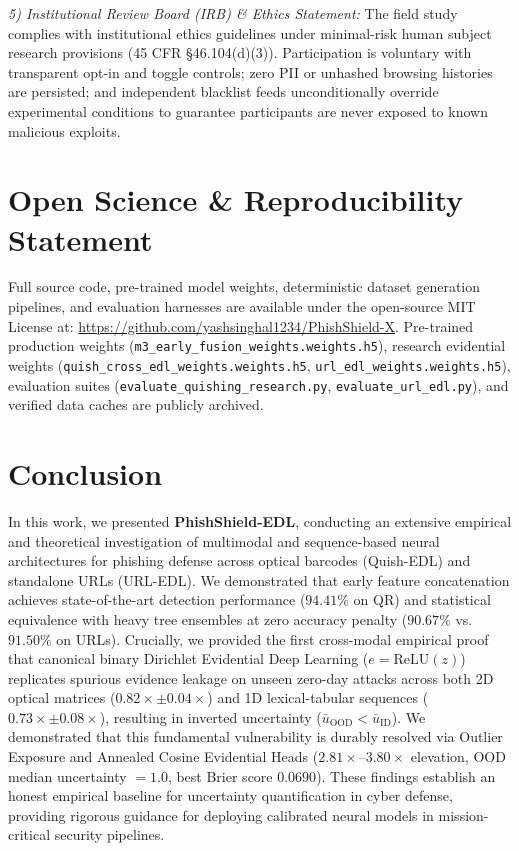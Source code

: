 \documentclass[conference]{IEEEtran}
\begin{document}
\textit{5) Institutional Review Board (IRB) \& Ethics Statement:} The field study complies with institutional ethics guidelines under minimal-risk human subject research provisions (45 CFR \S46.104(d)(3)). Participation is voluntary with transparent opt-in and toggle controls; zero PII or unhashed browsing histories are persisted; and independent blacklist feeds unconditionally override experimental conditions to guarantee participants are never exposed to known malicious exploits.

\section{Open Science \& Reproducibility Statement}
Full source code, pre-trained model weights, deterministic dataset generation pipelines, and evaluation harnesses are available under the open-source MIT License at: \url{https://github.com/yashsinghal1234/PhishShield-X}. Pre-trained production weights (\texttt{m3\_early\_fusion\_weights.weights.h5}), research evidential weights (\texttt{quish\_cross\_edl\_weights.weights.h5}, \texttt{url\_edl\_weights.weights.h5}), evaluation suites (\texttt{evaluate\_quishing\_research.py}, \texttt{evaluate\_url\_edl.py}), and verified data caches are publicly archived.

\section{Conclusion}
In this work, we presented \textbf{PhishShield-EDL}, conducting an extensive empirical and theoretical investigation of multimodal and sequence-based neural architectures for phishing defense across optical barcodes (Quish-EDL) and standalone URLs (URL-EDL). We demonstrated that early feature concatenation achieves state-of-the-art detection performance ($94.41\%$ on QR) and statistical equivalence with heavy tree ensembles at zero accuracy penalty ($90.67\%$ vs. $91.50\%$ on URLs). Crucially, we provided the first cross-modal empirical proof that canonical binary Dirichlet Evidential Deep Learning ($e = \text{ReLU}(z)$) replicates spurious evidence leakage on unseen zero-day attacks across both 2D optical matrices ($0.82\times \pm 0.04\times$) and 1D lexical-tabular sequences ($0.73\times \pm 0.08\times$), resulting in inverted uncertainty ($\bar{u}_{\text{OOD}} < \bar{u}_{\text{ID}}$). We demonstrated that this fundamental vulnerability is durably resolved via Outlier Exposure and Annealed Cosine Evidential Heads ($2.81\times\text{--}3.80\times$ elevation, OOD median uncertainty $= 1.0$, best Brier score $0.0690$). These findings establish an honest empirical baseline for uncertainty quantification in cyber defense, providing rigorous guidance for deploying calibrated neural models in mission-critical security pipelines.
\end{document}
